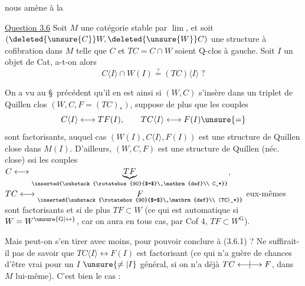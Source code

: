 nous amène à la

\uline{Question 3.6} Soit $M$ une catégorie stable par  $\lim$,
et soit $(\deleted{\unsure{C}}W,\deleted{\unsure{W}}C)$ une structure à cofibration dans
$M$ telle que $C$ et $TC=C\cap W$ soient Q-clos à gauche.
Soit $I$ un objet de Cat, a-t-on alors
\[
 C\langle I\rangle\cap W(I)\overset{?}{=}(TC)\langle I\rangle\;?\tag*{(3.6.1)}
\]

On a vu au \S\ précédent qu'il en est ainsi
si $(W,C)$ s'insère dans un triplet de
Quillen clos $(W,C,F=(TC)_*)$, 
suppose de plus que les couples
\[
 C\langle I\rangle\longleftrightarrow TF(I),\qquad TC\langle I\rangle\longleftrightarrow F(I)\unsure{=}
\]
sont factorisants, auquel cas $(W(I),C\langle I\rangle,F(I))$
est une structure de Quillen close dans $M(I)$.
D'ailleurs, $(W,C,F)$ est une structure de Quillen
(néc. close) ssi les couples
$C\longleftrightarrow\underset{\inserted{\substack{\rotatebox{90}{$=$}\,\mathrm{def}\\ C_*}}}{\underbrace{TF}}$,
$TC\longleftrightarrow\underset{\inserted{\substack{\rotatebox{90}{$=$}\,\mathrm{def}\\ (TC)_*}}}{F}$
eux-mêmes sont factorisants et si de plus
$TF\subset W$ (ce qui est automatique si $W=W^{\unsure{\mathrm{G}|\leftrightarrow}}$,
car on aura en tous cas, par  Cof 4, $TF\subset W^{\mathrm{G}}$).

Mais peut-on s'en tirer avec moins, pour
pouvoir conclure à (3.6.1) ? Ne suffirait-il
pas de savoir que $TC\langle I\rangle\longleftrightarrow F(I)$ est
factorisant (ce qui n'a guère de chances
d'être vrai pour un $I$ $\unsure{\ne|I}$ général, si on n'a
déjà $TC\mathrel{\longleftarrow\mkern-9mu|\mkern-9mu\longrightarrow}F$,  dans $M$
lui-même). C'est bien le cas :


